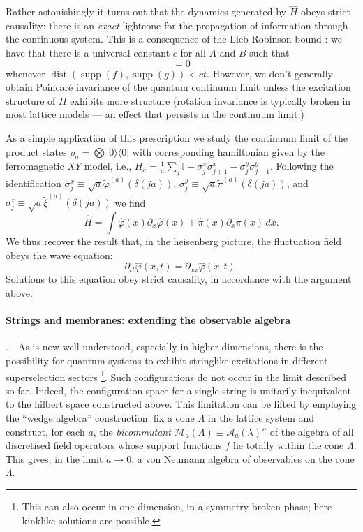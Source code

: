 \documentclass[prl,twocolumn,lengthcheck,superscriptaddress]{revtex4-1}
\newcommand{\supp}{\operatorname{supp}}
\newcommand{\dist}{\operatorname{dist}}
\theoremstyle{definition}
\theoremstyle{remark}
\begin{document}
Rather astonishingly it turns out that the dynamics generated by $\widehat{H}$ obeys strict causality: there is an \emph{exact} lightcone for the propagation of information through the continuous system. This is a consequence of the Lieb-Robinson bound  \cite{lieb:1972a,bratteli:1997a,nachtergaele:2010b}: we have that there is a universal constant $c$ for all $A$ and $B$ such that
\begin{equation}
	[\widehat{\phi}(f), e^{-it\widehat{H}} \widehat{\phi}(g)e^{it\widehat{H}} ] = 0
\end{equation}
whenever $\dist(\supp(f) , \supp(g)) < ct$. However, we don't generally obtain Poincar\'e invariance of the quantum continuum limit unless the excitation structure of $H$ exhibits more structure (rotation invariance is typically broken in most lattice models --- an effect that persists in the continuum limit.) 

As a simple application of this prescription we study the continuum limit of the product states $\rho_a = \bigotimes |0\rangle\langle 0|$ with corresponding hamiltonian given by the ferromagnetic $XY$ model, i.e., $H_a = \frac{1}{a}\sum_{j} \mathbb{I} - \sigma^x_j\sigma_{j+1}^x - \sigma^y_j\sigma_{j+1}^y$. Following the identification $\sigma^x_j \equiv \sqrt{a}\widetilde{\varphi}^{(a)}(\delta(ja))$, $\sigma^y_j \equiv \sqrt{a}\widetilde{\pi}^{(a)}(\delta(ja))$, and $\sigma^z_j \equiv \sqrt{a}\widetilde{\xi}^{(a)}(\delta(ja))$ we find
\begin{equation}
	\widehat{H} = \int \widehat{\varphi}(x) \partial_x\widehat{\varphi}(x) + \widehat{\pi}(x) \partial_x\widehat{\pi}(x) \, dx.
\end{equation}
We thus recover the result that, in the heisenberg picture, the fluctuation field obeys the wave equation:
\begin{equation}
	\partial_{tt}\widehat{\varphi}(x,t) = \partial_{xx}\widehat{\varphi}(x,t).
\end{equation}
Solutions to this equation obey strict causality, in accordance with the argument above.

\paragraph{Strings and membranes: extending the observable algebra}\hspace{-1em}.---As is now well understood, especially in higher dimensions, there is the possibility for quantum systems to exhibit stringlike excitations in different superselection sectors \footnote{This can also occur in one dimension, in a symmetry broken phase; here kinklike solutions are possible.}. Such configurations do not occur in the limit described so far. Indeed, the configuration space for a single string is unitarily inequivalent to the hilbert space constructed above. This limitation can be lifted by employing the ``wedge algebra'' construction: fix a cone $\Lambda$ in the lattice system and construct, for each $a$, the \emph{bicommutant} $\mathcal{M}_a(\Lambda) \equiv \mathcal{A}_a(\lambda)''$ of the algebra of all discretised field operators whose support functions $f$ lie totally within the cone $\Lambda$.  This gives, in the limit $a\rightarrow 0$, a von Neumann algebra of observables on the cone $\Lambda$.
\end{document}
